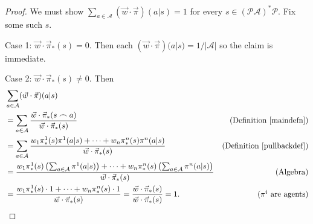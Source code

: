 \documentclass[runningheads]{llncs}
\begin{document}
\begin{proof}
    We must show
    $\sum_{a\in\mathcal A}(\vec w\cdot\vec\pi)(a|s)=1$ for every
    $s\in(\mathcal P\mathcal A)^*\mathcal P$. Fix some such $s$.

    Case 1: $\vec w\cdot \vec\pi_*(s)=0$. Then
    each $(\vec w\cdot\vec\pi)(a|s)=1/|\mathcal A|$ so the
    claim is immediate.

    Case 2: $\vec w\cdot \vec\pi_*(s)\not=0$. Then
    \begin{align*}
        &{} \sum_{a\in\mathcal A}(\vec w\cdot\vec\pi)(a|s)\\
            &= \sum_{a\in\mathcal A}
                \frac{\vec w\cdot \vec\pi_*(s\frown a)}{\vec w\cdot \vec\pi_*(s)}
                &\mbox{(Definition \ref{maindefn})}\\
            &= \sum_{a\in\mathcal A}
                \frac
                {w_1\pi^1_*(s)\pi^1(a|s)+\cdots+w_n\pi^n_*(s)\pi^n(a|s)}
                {\vec w\cdot\vec\pi_*(s)}
                &\mbox{(Definition \ref{pullbackdef})}\\
            &= \frac{
                w_1\pi^1_*(s)\left(\mbox{$\sum_{a\in\mathcal A}\pi^1(a|s)$}\right)
                +\cdots+
                w_n\pi^n_*(s)\left(\mbox{$\sum_{a\in\mathcal A}\pi^n(a|s)$}\right)
                }
                {\vec w\cdot \vec\pi_*(s)}
                &\mbox{(Algebra)}\\
            &= \frac
                {w_1\pi^1_*(s)\cdot 1 + \cdots + w_n\pi^n_*(s)\cdot1}
                {\vec w\cdot \vec\pi_*(s)}
                =\frac{\vec w\cdot \vec\pi_*(s)}{\vec w\cdot \vec\pi_*(s)}=1.
                &\mbox{($\pi^i$ are agents)}
    \end{align*}
\end{proof}
\end{document}
